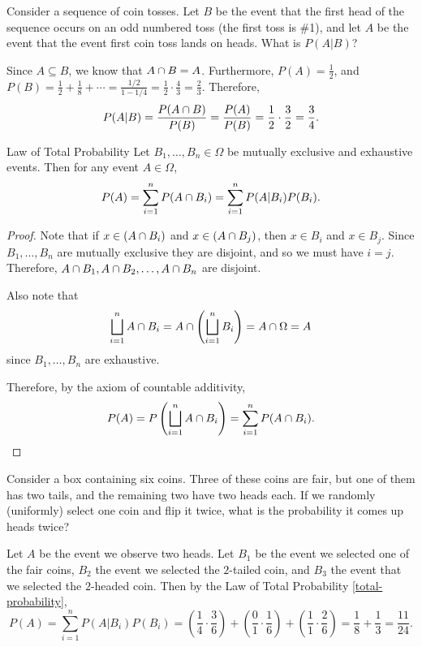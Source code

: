 \begin{exmp}
    Consider a sequence of coin tosses. Let $B$ be the event that the first head of the sequence occurs on an odd numbered toss (the first toss is \#1), and let $A$ be the event that the event first coin toss lands on heads. What is $P(A | B)$?

    Since $A \subseteq B$, we know that $A \cap B = A$. Furthermore, $P(A) = \frac{1}{2}$, and $P(B) = \frac{1}{2} + \frac{1}{8} + \cdots = \frac{1/2}{1-1/4} = \frac{1}{2}\cdot\frac{4}{3} = \frac{2}{3}$. Therefore, \[P(A | B) = \frac{P(A \cap B)}{P(B)} = \frac{P(A)}{P(B)} = \frac{1}{2}\cdot\frac{3}{2} = \frac{3}{4}.\]
\end{exmp}

\begin{thm}Law of Total Probability\label{total-probability}\proofbreak
    Let $B_1, \ldots, B_n \in \Omega$ be mutually exclusive and exhaustive events. Then for any event $A \in \Omega$,
    \[P(A) = \sum_{i=1}^{n}P(A \cap B_i) = \sum_{i=1}^{n}P(A | B_i)P(B_i).\]
\end{thm}

\begin{proof}
    Note that if $x \in (A \cap B_i)$ and $x \in (A \cap B_j)$, then $x \in B_i$ and $x \in B_j$. Since $B_1, \ldots, B_n$ are mutually exclusive they are disjoint, and so we must have $i = j$. Therefore, $A \cap B_1, A \cap B_2, \ldots, A \cap B_n$ are disjoint.

    Also note that
    \begin{align*}
        \bigsqcup_{i=1}^{n}A \cap B_i = A \cap \left(\bigsqcup_{i=1}^{n}B_i\right) = A \cap \Omega = A
    \end{align*}
    since $B_1, \ldots, B_n$ are exhaustive.

    Therefore, by the axiom of countable additivity,
    \begin{align*}
        P(A) = P\left(\bigsqcup_{i=1}^{n}A \cap B_i\right) = \sum_{i=1}^{n}P(A \cap B_i).
    \end{align*}
\end{proof}

\begin{exmp}
    Consider a box containing six coins. Three of these coins are fair, but one of them has two tails, and the remaining two have two heads each. If we randomly (uniformly) select one coin and flip it twice, what is the probability it comes up heads twice?

    Let $A$ be the event we observe two heads. Let $B_1$ be the event we selected one of the fair coins, $B_2$ the event we selected the $2$-tailed coin, and $B_3$ the event that we selected the $2$-headed coin. Then by the Law of Total Probability \ref{total-probability},
    \[P(A) = \sum_{i=1}^{n}P(A | B_i)P(B_i) = \left(\frac{1}{4}\cdot\frac{3}{6}\right) + \left(\frac{0}{1}\cdot\frac{1}{6}\right) + \left(\frac{1}{1}\cdot\frac{2}{6}\right) = \frac{1}{8} + \frac{1}{3} = \frac{11}{24}.\]
\end{exmp}

